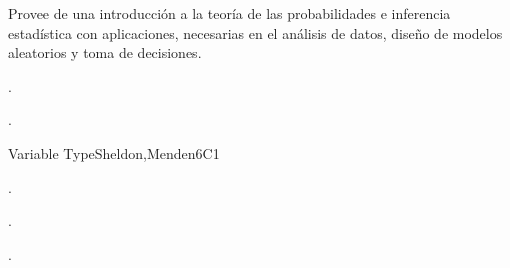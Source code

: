 
\begin{syllabus}


\begin{justification}
Provee de una introducción a la teoría de las probabilidades e inferencia estadística con aplicaciones, necesarias en el análisis de datos, diseño de modelos aleatorios y toma de decisiones.
\end{justification}

\begin{goals}
\item . %
\item . %
\end{goals}

\begin{outcomes}
   \item {}
   \item {}
   \item {}
\end{outcomes}

\begin{competences}
    \item {} 
    \item {}
    \item {}
\end{competences}


\begin{unit}{Variable Type}{}{Sheldon,Menden}{6}{C1}
\begin{topics}
      \item . %
   \end{topics}

   \begin{learningoutcomes}
      \item . %
      \item . %
   \end{learningoutcomes}
\end{unit}


\end{syllabus}
